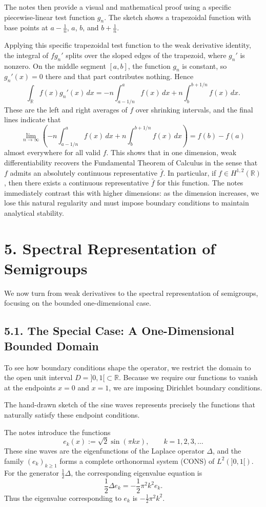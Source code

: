 \documentclass[11pt]{article}
\theoremstyle{definition}
\theoremstyle{remark}
\begin{document}
The notes then provide a visual and mathematical proof using a specific piecewise-linear test function \(g_n\). The sketch shows a trapezoidal function with base points at \(a-\frac1n\), \(a\), \(b\), and \(b+\frac1n\).

Applying this specific trapezoidal test function to the weak derivative identity, the integral of \(fg_n'\) splits over the sloped edges of the trapezoid, where \(g_n'\) is nonzero. On the middle segment \([a,b]\), the function \(g_n\) is constant, so \(g_n'(x)=0\) there and that part contributes nothing. Hence
\[
\int_{\mathbb R} f(x)g_n'(x)\,dx
=
-n\int_{a-1/n}^{a} f(x)\,dx+n\int_b^{b+1/n} f(x)\,dx.
\]
These are the left and right averages of \(f\) over shrinking intervals, and the final lines indicate that
\[
\lim_{n\to\infty}\left(-n\int_{a-1/n}^{a} f(x)\,dx+n\int_b^{b+1/n} f(x)\,dx\right)
=
f(b)-f(a)
\]
almost everywhere for all valid \(f\). This shows that in one dimension, weak differentiability recovers the Fundamental Theorem of Calculus in the sense that \(f\) admits an absolutely continuous representative \(\bar f\). In particular, if \(f\in H^{1,2}(\mathbb R)\), then there exists a continuous representative \(\bar f\) for this function. The notes immediately contrast this with higher dimensions: as the dimension increases, we lose this natural regularity and must impose boundary conditions to maintain analytical stability.

\section*{5. Spectral Representation of Semigroups}
We now turn from weak derivatives to the spectral representation of semigroups, focusing on the bounded one-dimensional case.

\subsection*{5.1. The Special Case: A One-Dimensional Bounded Domain}
To see how boundary conditions shape the operator, we restrict the domain to the open unit interval \(D=]0,1[\subset \mathbb R\). Because we require our functions to vanish at the endpoints \(x=0\) and \(x=1\), we are imposing Dirichlet boundary conditions.

The hand-drawn sketch of the sine waves represents precisely the functions that naturally satisfy these endpoint conditions.

The notes introduce the functions
\[
e_k(x):=\sqrt{2}\sin(\pi kx),
\qquad k=1,2,3,\dots
\]
These sine waves are the eigenfunctions of the Laplace operator \(\Delta\), and the family \((e_k)_{k\ge 1}\) forms a complete orthonormal system (CONS) of \(L^2(]0,1[)\). For the generator \(\frac12\Delta\), the corresponding eigenvalue equation is
\[
\frac12\Delta e_k
=
-\frac12\pi^2 k^2 e_k.
\]
Thus the eigenvalue corresponding to \(e_k\) is \(-\frac12\pi^2 k^2\).
\end{document}
